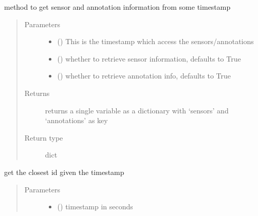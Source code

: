 \documentclass[letterpaper,10pt,english]{sphinxmanual}
\begin{document}
\begin{fulllineitems}
\begin{fulllineitems}
\label{\detokenize{radiate:radiate.Sequence.get_from_timestamp}}
method to get sensor and annotation information from some timestamp
\begin{quote}\begin{description}
\item[{Parameters}] \leavevmode\begin{itemize}
\item {} 
 () \textendash{} This is the timestamp which access the sensors/annotations

\item {} 
 (\sphinxstyleliteralemphasis{\sphinxupquote{, }}) \textendash{} whether to retrieve sensor information, defaults to True

\item {} 
 (\sphinxstyleliteralemphasis{\sphinxupquote{, }}) \textendash{} whether to retrieve annotation info, defaults to True

\end{itemize}

\item[{Returns}] \leavevmode
returns a single variable as a dictionary with ‘sensors’ and ‘annotations’ as key

\item[{Return type}] \leavevmode
dict

\end{description}\end{quote}

\end{fulllineitems}


\begin{fulllineitems}
\label{\detokenize{radiate:radiate.Sequence.get_id}}
get the closest id given the timestamp
\begin{quote}\begin{description}
\item[{Parameters}] \leavevmode\begin{itemize}
\item {} 
 () \textendash{} timestamp in seconds


\end{itemize}
\end{description}
\end{quote}
\end{fulllineitems}
\end{fulllineitems}
\end{document}
